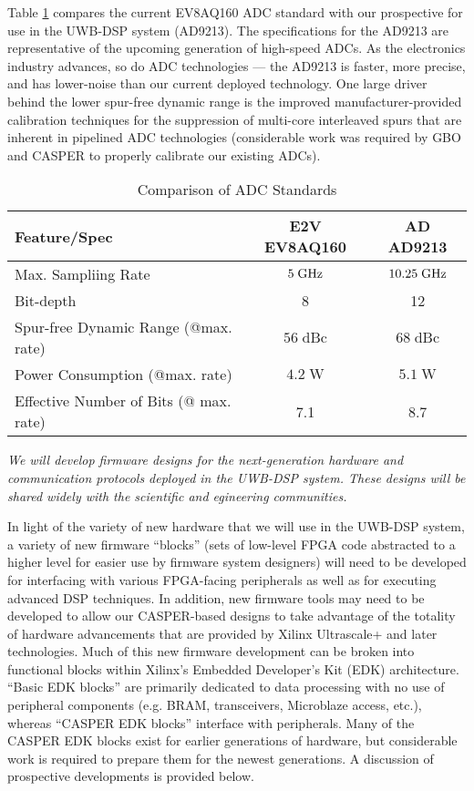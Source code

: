 \documentclass[10pt]{myNSF}
\begin{document}
 Table \ref{table:adc} compares the
current EV8AQ160 ADC standard with our prospective for use in the
UWB-DSP system (AD9213).  The specifications for the AD9213 are
representative of the upcoming generation of high-speed ADCs. As the
electronics industry advances, so do ADC technologies --- the AD9213
is faster, more precise, and has lower-noise than our current deployed
technology. One large driver behind the lower spur-free dynamic range
is the improved manufacturer-provided calibration techniques for the
suppression of multi-core interleaved spurs that are inherent in
pipelined ADC technologies (considerable work was required by GBO and
CASPER to properly calibrate our existing ADCs).

\begin{table}[h]
  \centering
  \caption{Comparison of ADC Standards \label{table:adc}}
  \begin{tabular}{|l|c|c|}
    \hline
    Feature/Spec & E2V EV8AQ160 & AD AD9213 \\
    \hline
    Max. Sampliing Rate & $5\; \textrm{GHz}$ & $10.25\; \textrm{GHz}$ \\
    Bit-depth & 8 & 12 \\
    Spur-free Dynamic Range (@max. rate) & $56\; \mathrm{dBc}$ & $68\; \mathrm{dBc}$ \\
    Power Consumption (@max. rate) & $4.2\; \mathrm{W}$ & $5.1\; \mathrm{W}$ \\
    Effective Number of Bits (@ max. rate) & 7.1 & 8.7 \\
    \hline
  \end{tabular}
\end{table}

\label{sec:firmware}

\emph{We will develop firmware designs for the next-generation
  hardware and communication protocols deployed in the UWB-DSP system.
  These designs will be shared widely with the scientific and
  egineering communities.}

In light of the variety of new hardware that we will use in the
UWB-DSP system, a variety of new firmware ``blocks'' (sets of
low-level FPGA code abstracted to a higher level for easier use by
firmware system designers) will need to be developed for interfacing
with various FPGA-facing peripherals as well as for executing advanced
DSP techniques.  In addition, new firmware tools may need to be
developed to allow our CASPER-based designs to take advantage of the
totality of hardware advancements that are provided by Xilinx
Ultrascale+ and later technologies. Much of this new firmware
development can be broken into functional blocks within Xilinx’s
Embedded Developer's Kit (EDK) architecture. ``Basic EDK blocks'' are
primarily dedicated to data processing with no use of peripheral
components (e.g. BRAM, transceivers, Microblaze access, etc.), whereas
``CASPER EDK blocks'' interface with peripherals. Many of the CASPER
EDK blocks exist for earlier generations of hardware, but considerable
work is required to prepare them for the newest generations. A
discussion of prospective developments is provided below.
\end{document}
